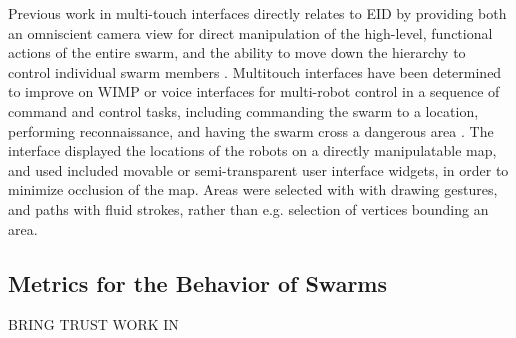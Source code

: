 \documentclass[]{article}
\begin{document}
Previous work in multi-touch interfaces directly relates to EID by providing both an omniscient camera view for direct manipulation of the high-level, functional actions of the entire swarm, and the ability to move down the hierarchy to control individual swarm members \cite{Micire:2009:ANG:1731903.1731912}.
Multitouch interfaces have been determined to improve on WIMP or voice interfaces for multi-robot control in a sequence of command and control tasks, including commanding the swarm to a location, performing reconnaissance, and having the swarm cross a dangerous area \cite{hayes2010multi}.
The interface displayed the locations of the robots on a directly manipulatable map, and used included movable or semi-transparent user interface widgets, in order to minimize occlusion of the map. 
Areas were selected with with drawing gestures, and paths with fluid strokes, rather than e.g. selection of vertices bounding an area.
\subsection{Metrics for the Behavior of Swarms}

BRING TRUST WORK IN 
\end{document}
